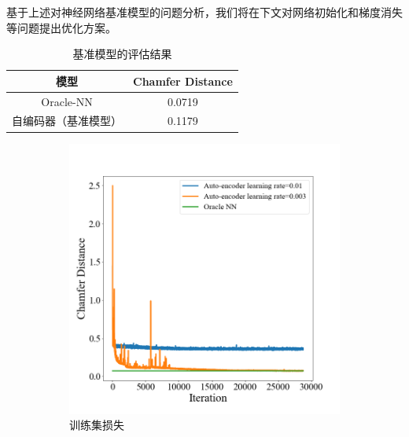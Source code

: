 \documentclass[bachelor, nocolorlinks, printoneside]{seuthesis} %
\begin{document}
\begin{Main}
基于上述对神经网络基准模型的问题分析，我们将在下文对网络初始化和梯度消失等问题提出优化方案。
\begin{table}
    \centering
    \caption{基准模型的评估结果}
    \label{table:metric_per_baseline}
    \begin{tabular}{cc} 
    \hline
    模型         & Chamfer Distance        \\ 
    \hline
    Oracle-NN  & 0.0719                  \\
    自编码器（基准模型） & 0.1179 \\
    \hline
    \end{tabular}
\end{table}

\begin{figure}[!htb]
    \centering
       \begin{subfigure}[t]{0.49\linewidth} \centering 
         \includegraphics[width=\columnwidth]{figs/model/ae_trainingloss.png}
         \caption{训练集损失}\label{fig:trainingloss}
       \end{subfigure}
      \begin{subfigure}[t]{0.49\linewidth} \centering

\end{subfigure}
\end{figure}
\end{Main}
\end{document}
